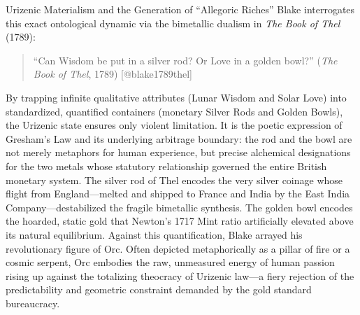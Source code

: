 \documentclass[
  ignorenonframetext,
]{beamer}
\begin{document}
\begin{frame}{Urizenic Materialism and the Generation of ``Allegoric
Riches''}
Blake interrogates this exact ontological dynamic via the bimetallic
dualism in \emph{The Book of Thel} (1789):

\begin{quote}
``Can Wisdom be put in a silver rod? Or Love in a golden bowl?''
(\emph{The Book of Thel}, 1789) {[}@blake1789thel{]}
\end{quote}

By trapping infinite qualitative attributes (Lunar Wisdom and Solar
Love) into standardized, quantified containers (monetary Silver Rods and
Golden Bowls), the Urizenic state ensures only violent limitation. It is
the poetic expression of Gresham's Law and its underlying arbitrage
boundary: the rod and the bowl are not merely metaphors for human
experience, but precise alchemical designations for the two metals whose
statutory relationship governed the entire British monetary system. The
silver rod of Thel encodes the very silver coinage whose flight from
England---melted and shipped to France and India by the East India
Company---destabilized the fragile bimetallic synthesis. The golden bowl
encodes the hoarded, static gold that Newton's 1717 Mint ratio
artificially elevated above its natural equilibrium. Against this
quantification, Blake arrayed his revolutionary figure of Orc. Often
depicted metaphorically as a pillar of fire or a cosmic serpent, Orc
embodies the raw, unmeasured energy of human passion rising up against
the totalizing theocracy of Urizenic law---a fiery rejection of the
predictability and geometric constraint demanded by the gold standard
bureaucracy.
\end{frame}
\end{document}
